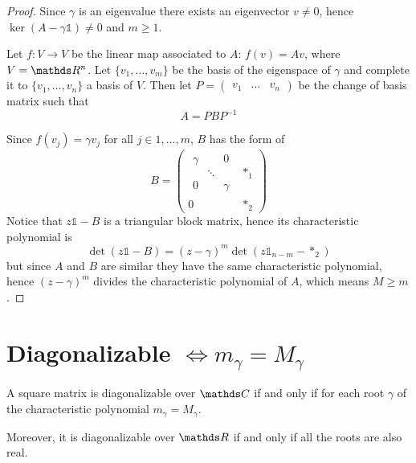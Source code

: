 \documentclass[12pt]{extarticle}
\numberwithin{equation}{section}
\begin{document}
\begin{proof}
    Since $\gamma$ is an eigenvalue there exists an eigenvector $v \neq 0$,
    hence $\ker (A - \gamma \mathds{1}) \ne 0$ and $m \geq 1$.

    Let $f: V \to V$ be the linear map associated to $A$: $f(v) = A v$, where $V = \R^n$.
    Let $\{v_1, \dots, v_m\}$ be the basis of the eigenspace of $\gamma$
    and complete it to $\{v_1, \dots, v_n\}$ a basis of $V$.
    Then let $P = \begin{pmatrix}v_1 & \dots & v_n\end{pmatrix}$ be the change of basis matrix
    such that
    \begin{equation}
        A = P B P^{-1}
    \end{equation}

    Since $f(v_j) = \gamma v_j$ for all $j \in 1, \dots, m$, $B$ has the form of
    \begin{equation}
        B = \left(\begin{array}{c|c}
            \begin{matrix}
                \gamma &        & 0      \\
                       & \ddots &        \\
                0      &        & \gamma
            \end{matrix} & *_1          \\
            \hline
            0                           & *_2
        \end{array}
        \right)
    \end{equation}
    Notice that $z \mathds{1} - B$ is a triangular block matrix, hence its characteristic polynomial is
    \begin{equation}
        \det(z \mathds 1 - B) = (z-\gamma)^m \det(z \mathds 1_{n-m} - *_2)
    \end{equation}
    but since $A$ and $B$ are similar they have the same characteristic polynomial,
    hence $(z-\gamma)^m$ divides the characteristic polynomial of $A$,
    which means $M \geq m$.
\end{proof}

\section{Diagonalizable \texorpdfstring{$\iff m_\gamma = M_\gamma$}{iff geometric equals to algebraic}}

\begin{theorem}{}{}
    A square matrix is diagonalizable over $\C$ if and only if
    for each root $\gamma$ of the characteristic polynomial
    $m_\gamma = M_\gamma$.

    Moreover, it is diagonalizable over $\R$ if and only if all the roots are also real.
\end{theorem}
\end{document}
